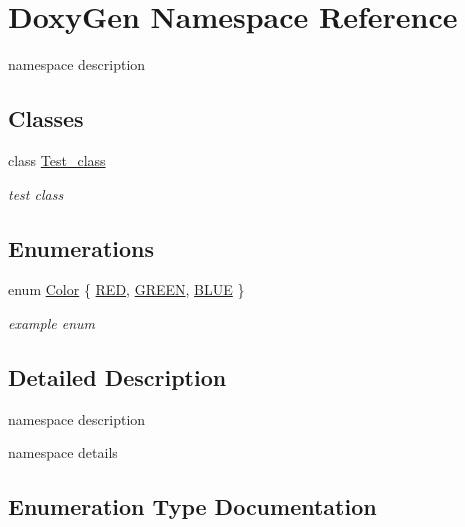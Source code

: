 \hypertarget{namespace_doxy_gen}{}\section{Doxy\+Gen Namespace Reference}
\label{namespace_doxy_gen}


namespace description  


\subsection*{Classes}
\begin{DoxyCompactItemize}
\item 
class \hyperlink{class_doxy_gen_1_1_test__class}{Test\+\_\+class}
\begin{DoxyCompactList}\small\item\em test class \end{DoxyCompactList}\end{DoxyCompactItemize}
\subsection*{Enumerations}
\begin{DoxyCompactItemize}
\item 
enum \hyperlink{namespace_doxy_gen_ab4fcc83d6a3b3b7d0a3e7b38947bbb91}{Color} \{ \hyperlink{namespace_doxy_gen_ab4fcc83d6a3b3b7d0a3e7b38947bbb91ab40c261690093c44e7397931a97f7861}{R\+ED}, 
\hyperlink{namespace_doxy_gen_ab4fcc83d6a3b3b7d0a3e7b38947bbb91a9bcf28dbf7b7999041475f695736aedb}{G\+R\+E\+EN}, 
\hyperlink{namespace_doxy_gen_ab4fcc83d6a3b3b7d0a3e7b38947bbb91a484d48e80ceb884f767df50188f01a06}{B\+L\+UE}
 \}\begin{DoxyCompactList}\small\item\em example enum \end{DoxyCompactList}
\end{DoxyCompactItemize}


\subsection{Detailed Description}
namespace description 

namespace details 

\subsection{Enumeration Type Documentation}
\hypertarget{namespace_doxy_gen_ab4fcc83d6a3b3b7d0a3e7b38947bbb91}{}\label{namespace_doxy_gen_ab4fcc83d6a3b3b7d0a3e7b38947bbb91} 
